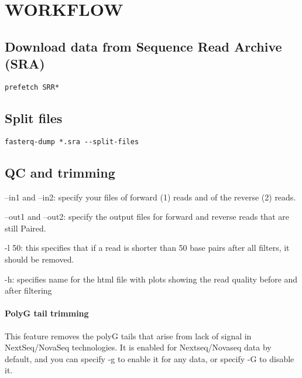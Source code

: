 \documentclass[
]{article}
\begin{document}
\hypertarget{workflow}{%
\section{WORKFLOW}\label{workflow}}

\hypertarget{download-data-from-sequence-read-archive-sra}{%
\subsection{Download data from Sequence Read Archive
(SRA)}\label{download-data-from-sequence-read-archive-sra}}

\begin{verbatim}
prefetch SRR*
\end{verbatim}

\hypertarget{split-files}{%
\subsection{Split files}\label{split-files}}

\begin{verbatim}
fasterq-dump *.sra --split-files
\end{verbatim}

\hypertarget{qc-and-trimming}{%
\subsection{QC and trimming}\label{qc-and-trimming}}

--in1 and --in2: specify your files of forward (1) reads and of the
reverse (2) reads.

--out1 and --out2: specify the output files for forward and reverse
reads that are still Paired.

-l 50: this specifies that if a read is shorter than 50 base pairs after
all filters, it should be removed.

-h: specifies name for the html file with plots showing the read quality
before and after filtering

\hypertarget{polyg-tail-trimming}{%
\paragraph{PolyG tail trimming}\label{polyg-tail-trimming}}

This feature removes the polyG tails that arise from lack of signal in
NextSeq/NovaSeq technologies. It is enabled for Nextseq/Novaseq data by
default, and you can specify -g to enable it for any data, or specify -G
to disable it.
\end{document}
